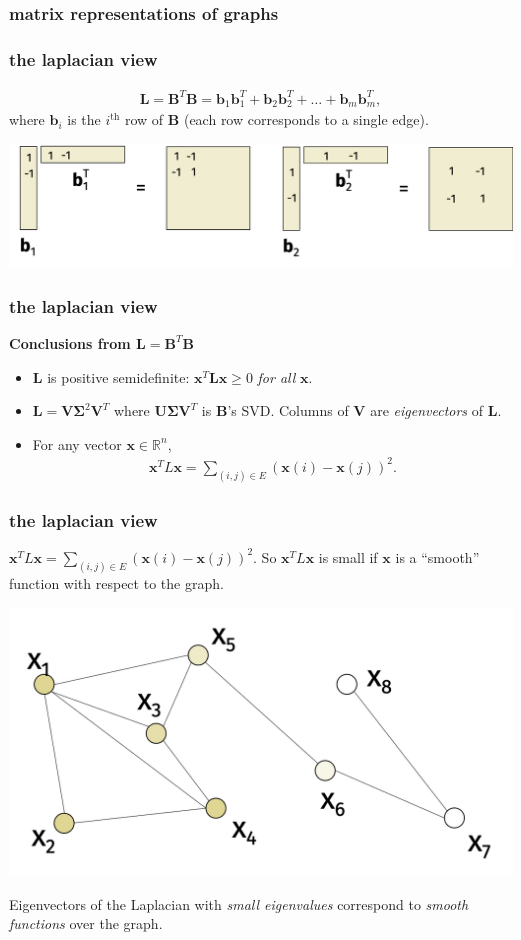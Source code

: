 \documentclass[compress]{beamer}
\newcommand{\bs}[1]{\boldsymbol{#1}}
\newcommand{\bv}[1]{\mathbf{#1}}
\newcommand{\R}{\mathbb{R}}
\begin{document}
\begin{frame}[t]
	\frametitle{matrix representations of graphs}
	\frametitle{the laplacian view}
	\begin{align*}
		\bv{L} = \bv{B}^T\bv{B} = \bv{b}_1\bv{b}_1^T + \bv{b}_2\bv{b}_2^T + \ldots + \bv{b}_m\bv{b}_m^T,
	\end{align*}
where $\bv{b}_i$ is the $i^\text{th}$ row of $\bv{B}$ (each row corresponds to a single edge). 
	\begin{center}
	\includegraphics[width=\textwidth]{edge_vertex.png}
\end{center}
\end{frame}

\begin{frame}[t]
	\frametitle{the laplacian view}
	\textbf{Conclusions from $\bv{L} = \bv{B}^T\bv{B}$}
	\begin{itemize}
		\item $\bv{L}$ is positive semidefinite: $\bv{x}^T\bv{L}\bv{x} \geq 0$ \emph{for all} $\bv{x}$. 
		\vspace{1em}
		\item $\bv{L} = \bv{V}\bs{\Sigma}^2\bv{V}^T$ where $\bv{U}\bs{\Sigma}\bv{V}^T$ is $\bv{B}$'s SVD. Columns of $\bv{V}$ are \emph{eigenvectors} of $\bv{L}$.
		\vspace{1em}
		\item 	\alert{For any vector $\bv{x}\in \R^n$, 
		\begin{align*}
			\bv{x}^T L \bv{x} = \sum_{(i,j)  \in E} (\bv{x}(i)- \bv{x}(j))^2. 
		\end{align*}}
	\end{itemize}	
\end{frame}

\begin{frame}[t]
	\frametitle{the laplacian view}
	$\bv{x}^T L \bv{x} = \sum_{(i,j)  \in E} (\bv{x}(i)- \bv{x}(j))^2$. So $\bv{x}^T L \bv{x}$ is small if $\bv{x}$ is a ``smooth'' function with respect to the graph. 
	\begin{center}
		\includegraphics[width=.8\textwidth]{smooth_func.png}
		
		Eigenvectors of the Laplacian with \emph{small eigenvalues} correspond to \emph{smooth functions} over the graph.
	\end{center}
\end{frame}
\end{document}
